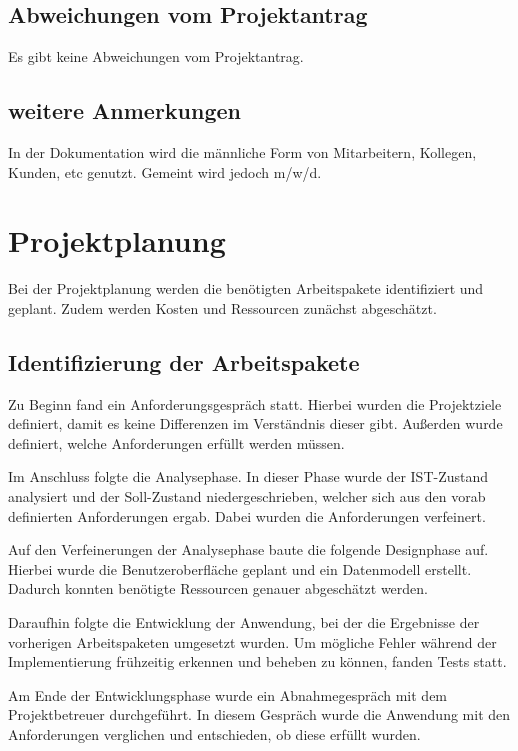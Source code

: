 \documentclass[11pt]{article}
\begin{document}
\subsection{Abweichungen vom Projektantrag}
Es gibt keine Abweichungen vom Projektantrag.

\subsection{weitere Anmerkungen}
In der Dokumentation wird die männliche Form von Mitarbeitern, Kollegen, Kunden, etc genutzt.
Gemeint wird jedoch m/w/d.


%
%

\section{Projektplanung}
Bei der Projektplanung werden die benötigten Arbeitspakete identifiziert und geplant.
Zudem werden Kosten und Ressourcen zunächst abgeschätzt.

\subsection{Identifizierung der Arbeitspakete}
Zu Beginn fand ein Anforderungsgespräch statt. Hierbei wurden die Projektziele 
definiert, damit es keine Differenzen im Verständnis dieser gibt. Außerden wurde definiert, welche Anforderungen erfüllt werden müssen. 

Im Anschluss folgte die Analysephase. In dieser Phase wurde der IST-Zustand analysiert und 
der Soll-Zustand niedergeschrieben, welcher sich aus den vorab definierten Anforderungen ergab.
Dabei wurden die Anforderungen verfeinert.

Auf den Verfeinerungen der Analysephase baute die folgende Designphase auf.
Hierbei wurde die Benutzeroberfläche geplant und
ein Datenmodell erstellt. Dadurch konnten benötigte Ressourcen genauer abgeschätzt werden.

Daraufhin folgte die Entwicklung der Anwendung, bei der die Ergebnisse der 
vorherigen Arbeitspaketen umgesetzt wurden. Um mögliche Fehler während der 
Implementierung frühzeitig erkennen und beheben zu können, fanden Tests statt. 

Am Ende der Entwicklungsphase wurde ein Abnahmegespräch mit dem Projektbetreuer durchgeführt. 
In diesem Gespräch wurde die Anwendung mit den Anforderungen verglichen und entschieden, ob diese
erfüllt wurden.
\end{document}
